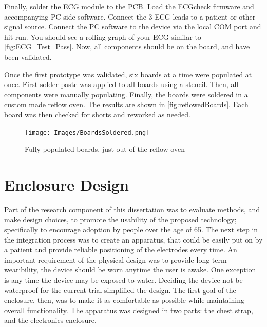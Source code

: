 Finally, solder the ECG module to the PCB. Load the ECGcheck firmware and accompanying PC side software. Connect the 3 ECG leads to a patient or other signal source. Connect the PC software to the device via the local COM port and hit run. You should see a rolling graph of your ECG similar to \cref{fig:ECG_Test_Pass}. Now, all components should be on the board, and have been validated.


Once the first prototype was validated, six boards at a time were populated at once. First solder paste was applied to all boards using a stencil. Then, all components were manually populating. Finally, the boards were soldered in a custom made reflow oven. The results are shown in \cref{fig:reflowedBoards}. Each board was then checked for shorts and reworked as needed.

\begin{figure}[h]
\begin{center}
	\label{fig:ReflowedBoards}
	\texttt{[image: Images/BoardsSoldered.png]} 
	\caption{Fully populated boards, just out of the reflow oven}
\end{center}
\end{figure}


\section {Enclosure Design}
\label{sec:EnclosureDesign}
Part of the research component of this dissertation was to evaluate methods, and make design choices, to promote the usability of the  proposed technology; specifically to encourage adoption by people over the age of 65. The next step in the integration process was to create an apparatus, that could be easily put on by a patient and provide reliable positioning of the electrodes every time. An important requirement of the physical design was to provide long term wearibility, the device should be worn anytime the user is awake. One exception is any time the device may be exposed to water. Deciding the device not be waterproof for the current trial simplified the design. The first goal of the enclosure, then, was to make it as comfortable as possible while maintaining overall functionality. The apparatus was designed in two parts: the chest strap, and the electronics enclosure. 




